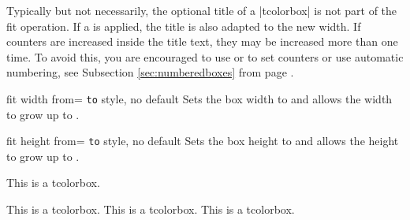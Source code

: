 \begin{marker}
Typically but not necessarily, the optional title of a |tcolorbox| is not part of the fit operation.
If a  is applied, the title is also adapted to
the new width. If counters are increased inside the title text, they may be
increased more than one time.
To avoid this, you are encouraged to use  or 
to set counters or use automatic numbering, see Subsection \ref{sec:numberedboxes}
from page \pageref{sec:numberedboxes}.
\end{marker}


\begin{docTcbKey}{fit width from}{= \texttt{to} }{style, no default}
  Sets the box width to  and allows the width to grow up to .
\begin{dispExample}

\begin{tcolorbox}[fit,width=\linewidth/2]
\lipsum[2]
\end{tcolorbox}\par
\begin{tcolorbox}[fit width from=\linewidth/2 to \linewidth]
\lipsum[2]
\end{tcolorbox}\par
\end{dispExample}
\end{docTcbKey}

\clearpage
\begin{docTcbKey}{fit height from}{= \texttt{to} }{style, no default}
  Sets the box height to  and allows the height to grow up to .
\begin{dispExample}

\begin{mybox}
This is a tcolorbox.
\end{mybox}
\begin{mybox}
This is a tcolorbox. This is a tcolorbox. This is a tcolorbox.
\end{mybox}
\begin{mybox}
\lipsum[2]
\end{mybox}
\end{dispExample}
\end{docTcbKey}

